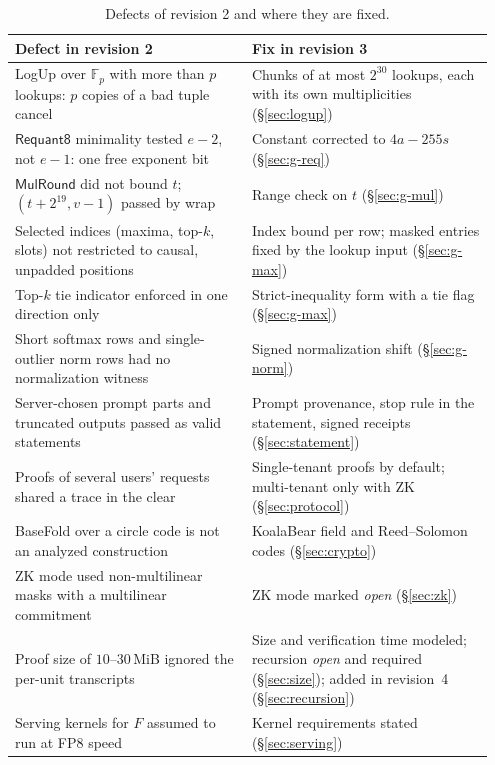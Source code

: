\documentclass[11pt]{article}
\newcommand{\F}{\mathbb{F}}
\newcommand{\Fp}{\F_p}
\begin{document}
\begin{table}[h]
\centering\small
\begin{tabular}{@{}p{0.47\linewidth}p{0.48\linewidth}@{}}
\toprule
Defect in revision 2 & Fix in revision 3 \\
\midrule
LogUp over \(\Fp\) with more than \(p\) lookups: \(p\) copies of a bad tuple cancel & Chunks of at most \(2^{30}\) lookups, each with its own multiplicities (\S\ref{sec:logup}) \\
\(\mathsf{Requant8}\) minimality tested \(e-2\), not \(e-1\): one free exponent bit & Constant corrected to \(4a - 255s\) (\S\ref{sec:g-req}) \\
\(\mathsf{MulRound}\) did not bound \(t\); \((t + 2^{19}, v - 1)\) passed by wrap & Range check on \(t\) (\S\ref{sec:g-mul}) \\
Selected indices (maxima, top-\(k\), slots) not restricted to causal, unpadded positions & Index bound per row; masked entries fixed by the lookup input (\S\ref{sec:g-max}) \\
Top-\(k\) tie indicator enforced in one direction only & Strict-inequality form with a tie flag (\S\ref{sec:g-max}) \\
Short softmax rows and single-outlier norm rows had no normalization witness & Signed normalization shift (\S\ref{sec:g-norm}) \\
Server-chosen prompt parts and truncated outputs passed as valid statements & Prompt provenance, stop rule in the statement, signed receipts (\S\ref{sec:statement}) \\
Proofs of several users' requests shared a trace in the clear & Single-tenant proofs by default; multi-tenant only with ZK (\S\ref{sec:protocol}) \\
BaseFold over a circle code is not an analyzed construction & KoalaBear field and Reed--Solomon codes (\S\ref{sec:crypto}) \\
ZK mode used non-multilinear masks with a multilinear commitment & ZK mode marked \emph{open} (\S\ref{sec:zk}) \\
Proof size of \(10\)--\(30\)\,MiB ignored the per-unit transcripts & Size and verification time modeled; recursion \emph{open} and required (\S\ref{sec:size}); added in revision~4 (\S\ref{sec:recursion}) \\
Serving kernels for \(F\) assumed to run at FP8 speed & Kernel requirements stated (\S\ref{sec:serving}) \\
\bottomrule
\end{tabular}
\caption{Defects of revision 2 and where they are fixed.}
\label{tab:rev3}
\end{table}
\end{document}
